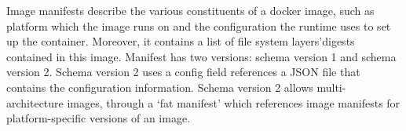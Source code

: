 %
%
%
%
%



%
%
Image manifests describe the various constituents of a docker image, such as platform which the image runs on and the configuration the runtime uses to set up the container.
%
Moreover, it contains a list of file system layers'digests contained in this image.
%
Manifest has two versions: schema version 1 and schema version 2.
%
Schema version 2 uses a config field references a JSON file that contains the configuration information.
%
Schema version 2 allows multi-architecture images, through a `fat manifest' which references image manifests for platform-specific versions of an image.








